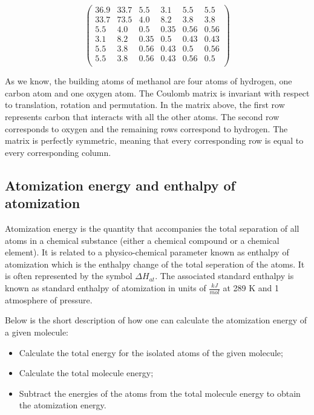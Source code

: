 \documentclass[a4paper,oneside,openright,11pt]{book}
\begin{document}
\begin{equation}
\begin{pmatrix}
36.9 & 33.7 & 5.5 & 3.1 & 5.5 & 5.5\\
33.7 & 73.5 & 4.0 & 8.2 & 3.8 & 3.8\\
5.5 & 4.0 & 0.5 & 0.35 & 0.56 & 0.56\\
3.1 & 8.2 & 0.35 & 0.5 & 0.43 & 0.43\\
5.5 & 3.8 & 0.56 & 0.43 & 0.5 & 0.56\\
5.5 & 3.8 & 0.56 & 0.43 & 0.56 & 0.5\\
\end{pmatrix}
\end{equation}

As we know, the building atoms of methanol are four atoms of hydrogen, one carbon atom and one oxygen atom. The Coulomb matrix is invariant with respect to translation, rotation and permutation. In the matrix above, the first row represents carbon that interacts with all the other atoms. The second row corresponds to oxygen and the remaining rows correspond to hydrogen. The matrix is perfectly symmetric, meaning that every corresponding row is equal to every corresponding column.


\subsection{Atomization energy and enthalpy of atomization}

Atomization energy is the quantity that accompanies the total separation of all atoms in a chemical substance (either a chemical compound or a chemical element). It is related to a physico-chemical parameter known as enthalpy of atomization which is the enthalpy change of the total seperation of the atoms. It is often represented by the symbol $\Delta H_{at}$. The associated standard enthalpy is known as standard enthalpy of atomization in units of $\frac{kJ}{mol}$ at 289 K and 1 atmosphere of pressure.

Below is the short description of how one can calculate the atomization energy of a given molecule:

\begin{itemize}
    \item Calculate the total energy for the isolated atoms of the given molecule;
    \item Calculate the total molecule energy;
    \item Subtract the energies of the atoms from the total molecule energy to obtain the atomization energy.
\end{itemize}
\end{document}
